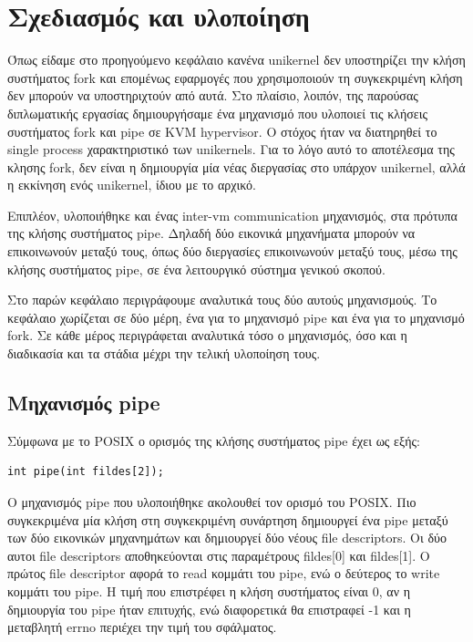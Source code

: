 \chapter{Σχεδιασμός και υλοποίηση}
\label{chap:implementation}

Όπως είδαμε στο προηγούμενο κεφάλαιο κανένα unikernel  δεν υποστηρίζει
την κλήση συστήματος fork και επομένως εφαρμογές που χρησιμοποιούν τη
συγκεκριμένη κλήση δεν μπορούν να υποστηριχτούν από αυτά. Στο πλαίσιο, λοιπόν,
της παρούσας διπλωματικής εργασίας δημιουργήσαμε ένα μηχανισμό που
υλοποιεί τις κλήσεις συστήματος fork και pipe σε KVM hypervisor. Ο στόχος ήταν
να διατηρηθεί το single process χαρακτηριστικό των unikernels. Για το λόγο
αυτό το αποτέλεσμα της κλησης fork, δεν είναι η δημιουργία μία νέας διεργασίας
στο υπάρχον unikernel, αλλά η εκκίνηση ενός unikernel, ίδιου με το αρχικό. 

Επιπλέον, υλοποιήθηκε και ένας inter-vm communication μηχανισμός, στα πρότυπα
της κλήσης συστήματος pipe. Δηλαδή δύο εικονικά μηχανήματα μπορούν να
επικοινωνούν μεταξύ τους, όπως δύο διεργασίες επικοινωνούν μεταξύ τους, μέσω της
κλήσης συστήματος pipe, σε ένα λειτουργικό σύστημα γενικού σκοπού. 

Στο παρών κεφάλαιο περιγράφουμε αναλυτικά τους δύο αυτούς μηχανισμούς. Το
κεφάλαιο χωρίζεται σε δύο μέρη, ένα για το μηχανισμό pipe και ένα για το
μηχανισμό fork. Σε κάθε μέρος περιγράφεται αναλυτικά τόσο ο μηχανισμός, όσο και
η διαδικασία και τα στάδια μέχρι την τελική υλοποίηση τους.

\newpage
\section{Μηχανισμός pipe}

Σύμφωνα με το POSIX ο ορισμός της κλήσης συστήματος pipe έχει ως εξής:
\begin{lstlisting}[numbers=none,  xleftmargin=.2\textwidth, xrightmargin=.2\textwidth]
int pipe(int fildes[2]);
\end{lstlisting}
Ο μηχανισμός pipe που υλοποιήθηκε ακολουθεί τον ορισμό του
POSIX. Πιο συγκεκριμένα μία κλήση στη συγκεκριμένη συνάρτηση δημιουργεί ένα pipe
μεταξύ των δύο εικονικών μηχανημάτων και δημιουργεί δύο νέους file descriptors.
Οι δύο αυτοι file descriptors αποθηκεύονται στις παραμέτρους fildes[0] και
fildes[1]. Ο πρώτος file descriptor αφορά το read κομμάτι του pipe, ενώ ο
δεύτερος το write κομμάτι του pipe. Η τιμή που επιστρέφει η κλήση συστήματος
είναι 0, αν η δημιουργία του pipe ήταν επιτυχής, ενώ διαφορετικά θα επιστραφεί
-1 και η μεταβλητή errno περιέχει την τιμή του σφάλματος.


